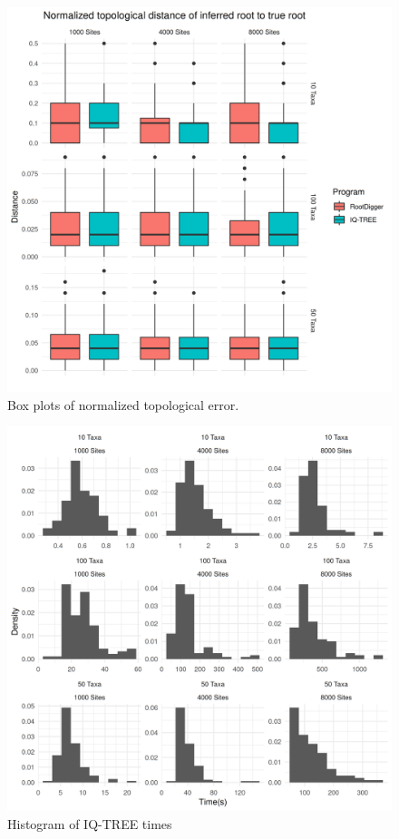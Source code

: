 \documentclass{article}
\begin{document}
\begin{figure}
  \begin{center}
    \includegraphics[width=.9\linewidth]{./figs/sim_results/melted_norm_dist_box.png}
    \caption{Box plots of normalized topological error.
    \label{fig:norm_error_boxplot}}
\end{center}
\end{figure}

\begin{figure}
  \begin{center}
    \includegraphics[width=.9\linewidth]{./figs/timing_plots/iq_time_hist.png}
  \caption{Histogram of IQ-TREE times
  \label{fig:iq_time_results}}
\end{center}
\end{figure}
\end{document}
